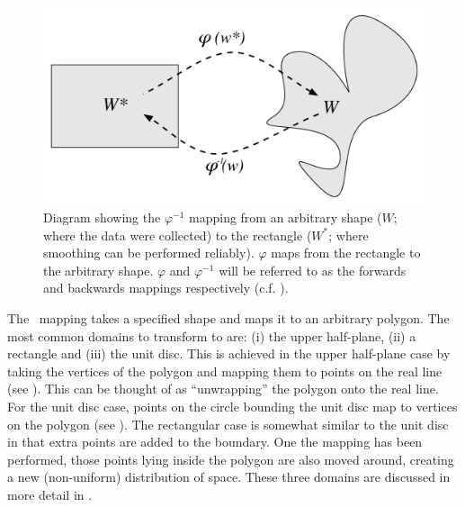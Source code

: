 
\begin{figure} [t]
\centering
\includegraphics[scale=0.5]{sc/figs/mappingdia.pdf}
\caption{Diagram showing the $\varphi^{-1}$ mapping from an arbitrary shape ($W$; where the data were collected) to the rectangle ($W^*$; where smoothing can be performed reliably). $\varphi$ maps from the rectangle to the arbitrary shape. $\varphi$ and $\varphi^{-1}$  will be referred to as the forwards and backwards mappings respectively (c.f. ).\label{cor-3s4}}
\label{mappingdia}
\end{figure}



The \sch\ mapping takes a specified shape and maps it to an arbitrary polygon\label{cor-3s6}. The most common domains to transform to are: (i) the upper half-plane, (ii) a rectangle and (iii) the unit disc. This is achieved in the upper half-plane case by taking the vertices of the polygon and mapping them to points on the real line (see ). This can be thought of as ``unwrapping'' the polygon onto the real line. For the unit disc case, points on the circle bounding the unit disc map to vertices on the polygon (see ). The rectangular case is somewhat similar to the unit disc in that extra points are added to the boundary. One the mapping has been performed, those points lying inside the polygon are also moved around, creating a new (non-uniform) distribution of space. These three domains are discussed in more detail in .

